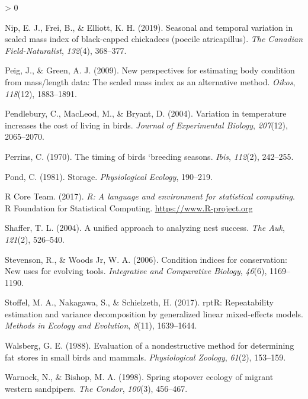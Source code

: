 \documentclass[
]{article}
\newlength{\cslhangindent}
\newenvironment{CSLReferences}[2] %
 {%
  \setlength{\parindent}{0pt}
  \ifodd #1 \everypar{\setlength{\hangindent}{\cslhangindent}}\ignorespaces\fi
  \ifnum #2 > 0
  \setlength{\parskip}{#2\baselineskip}
  \fi
 }%
 {}
\begin{document}
\begin{CSLReferences}{1}{0}
\leavevmode\hypertarget{ref-nip2019seasonal}{}%
Nip, E. J., Frei, B., \& Elliott, K. H. (2019). Seasonal and temporal
variation in scaled mass index of black-capped chickadees (poecile
atricapillus). \emph{The Canadian Field-Naturalist}, \emph{132}(4),
368--377.

\leavevmode\hypertarget{ref-peig2009new}{}%
Peig, J., \& Green, A. J. (2009). New perspectives for estimating body
condition from mass/length data: The scaled mass index as an alternative
method. \emph{Oikos}, \emph{118}(12), 1883--1891.

\leavevmode\hypertarget{ref-pendlebury2004variation}{}%
Pendlebury, C., MacLeod, M., \& Bryant, D. (2004). Variation in
temperature increases the cost of living in birds. \emph{Journal of
Experimental Biology}, \emph{207}(12), 2065--2070.

\leavevmode\hypertarget{ref-perrins1970timing}{}%
Perrins, C. (1970). The timing of birds `breeding seasons. \emph{Ibis},
\emph{112}(2), 242--255.

\leavevmode\hypertarget{ref-pond1981storage}{}%
Pond, C. (1981). Storage. \emph{Physiological Ecology}, 190--219.

\leavevmode\hypertarget{ref-rcoreteam}{}%
R Core Team. (2017). \emph{R: A language and environment for statistical
computing}. R Foundation for Statistical Computing.
\url{https://www.R-project.org}

\leavevmode\hypertarget{ref-shaffer2004unified}{}%
Shaffer, T. L. (2004). A unified approach to analyzing nest success.
\emph{The Auk}, \emph{121}(2), 526--540.

\leavevmode\hypertarget{ref-stevenson2006condition}{}%
Stevenson, R., \& Woods Jr, W. A. (2006). Condition indices for
conservation: New uses for evolving tools. \emph{Integrative and
Comparative Biology}, \emph{46}(6), 1169--1190.

\leavevmode\hypertarget{ref-stoffel2017rptr}{}%
Stoffel, M. A., Nakagawa, S., \& Schielzeth, H. (2017). rptR:
Repeatability estimation and variance decomposition by generalized
linear mixed-effects models. \emph{Methods in Ecology and Evolution},
\emph{8}(11), 1639--1644.

\leavevmode\hypertarget{ref-walsberg1988evaluation}{}%
Walsberg, G. E. (1988). Evaluation of a nondestructive method for
determining fat stores in small birds and mammals. \emph{Physiological
Zoology}, \emph{61}(2), 153--159.

\leavevmode\hypertarget{ref-warnock1998spring}{}%
Warnock, N., \& Bishop, M. A. (1998). Spring stopover ecology of migrant
western sandpipers. \emph{The Condor}, \emph{100}(3), 456--467.


\end{CSLReferences}
\end{document}
